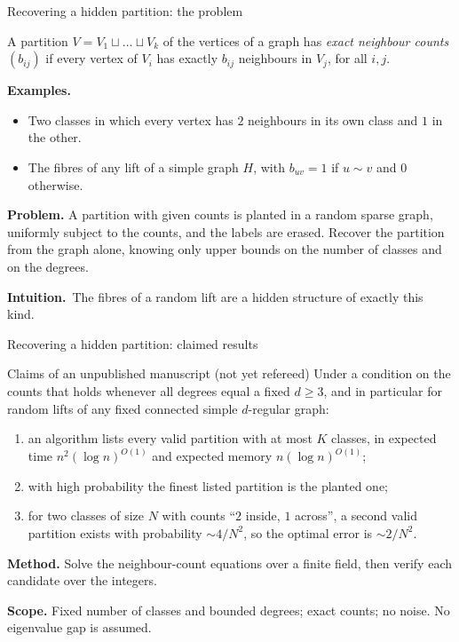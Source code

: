 \documentclass[aspectratio=169,10pt]{beamer}
\newcommand{\intuition}{{\color{accent}\textbf{Intuition.}}\ }
\begin{document}
\begin{frame}{Recovering a hidden partition: the problem}
  \begin{definition}
    A partition $V=V_1\sqcup\dots\sqcup V_k$ of the vertices of a graph has \emph{exact neighbour
    counts} $(b_{ij})$ if every vertex of $V_i$ has exactly $b_{ij}$ neighbours in $V_j$, for all $i,j$.
  \end{definition}
  \textbf{Examples.}
  \begin{itemize}
    \item Two classes in which every vertex has $2$ neighbours in its own class and $1$ in the other.
    \item The fibres of any lift of a simple graph $H$, with $b_{uv}=1$ if $u\sim v$ and $0$ otherwise.
  \end{itemize}
  \textbf{Problem.} A partition with given counts is planted in a random sparse graph, uniformly
  subject to the counts, and the labels are erased. Recover the partition from the graph alone,
  knowing only upper bounds on the number of classes and on the degrees.

  \intuition The fibres of a random lift are a hidden structure of exactly this kind.
\end{frame}

\begin{frame}{Recovering a hidden partition: claimed results}
  \begin{block}{Claims of an unpublished manuscript (not yet refereed)}
    Under a condition on the counts that holds whenever all degrees equal a fixed $d\ge3$, and in
    particular for random lifts of any fixed connected simple $d$-regular graph:
    \begin{enumerate}
      \item an algorithm lists every valid partition with at most $K$ classes, in expected time
            $n^{2}(\log n)^{O(1)}$ and expected memory $n(\log n)^{O(1)}$;
      \item with high probability the finest listed partition is the planted one;
      \item for two classes of size $N$ with counts ``$2$ inside, $1$ across'', a second valid
            partition exists with probability $\sim 4/N^{2}$, so the optimal error is $\sim 2/N^{2}$.
    \end{enumerate}
  \end{block}
  \textbf{Method.} Solve the neighbour-count equations over a finite field, then verify each
  candidate over the integers.

  \textbf{Scope.} Fixed number of classes and bounded degrees; exact counts; no noise.
  No eigenvalue gap is assumed.
\end{frame}
\end{document}
